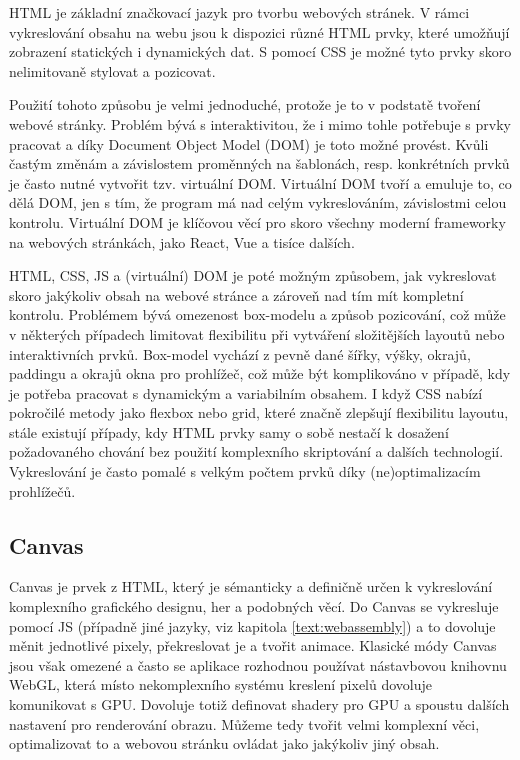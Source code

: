 HTML  je základní značkovací jazyk pro tvorbu webových stránek. 
V rámci vykreslování obsahu na webu jsou k dispozici různé HTML prvky, které umožňují zobrazení statických i dynamických dat.
S pomocí CSS je možné tyto prvky skoro nelimitovaně stylovat a pozicovat.

Použití tohoto způsobu je velmi jednoduché, protože je to v podstatě tvoření webové stránky.
Problém bývá s interaktivitou, že i mimo tohle potřebuje s prvky pracovat a díky Document Object Model (DOM) je toto možné provést.
Kvůli častým změnám a závislostem proměnných na šablonách, resp. konkrétních prvků je často nutné vytvořit tzv. virtuální DOM.
Virtuální DOM tvoří a emuluje to, co dělá DOM, jen s tím, že program má nad celým vykreslováním, závislostmi celou kontrolu.
Virtuální DOM je klíčovou věcí pro skoro všechny moderní frameworky na webových stránkách, jako React, Vue a tisíce dalších.

HTML, CSS, JS a (virtuální) DOM je poté možným způsobem, jak vykreslovat skoro jakýkoliv obsah na webové stránce a zároveň nad tím mít kompletní kontrolu.
Problémem bývá omezenost box-modelu a způsob pozicování, což může v některých případech limitovat flexibilitu při vytváření složitějších layoutů nebo interaktivních prvků. Box-model vychází z pevně dané šířky, výšky, okrajů, paddingu a okrajů okna pro prohlížeč, což může být komplikováno v případě, kdy je potřeba pracovat s dynamickým a variabilním obsahem. 
I když CSS nabízí pokročilé metody jako flexbox nebo grid, které značně zlepšují flexibilitu layoutu, stále existují případy, kdy HTML prvky samy o sobě nestačí k dosažení požadovaného chování bez použití komplexního skriptování a dalších technologií.
Vykreslování je často pomalé s velkým počtem prvků díky (ne)optimalizacím prohlížečů.

\subsection{Canvas}

Canvas je prvek z HTML, který je sémanticky a definičně určen k vykreslování komplexního grafického designu, her a podobných věcí.
Do Canvas se vykresluje pomocí JS (případně jiné jazyky, viz kapitola \ref{text:webassembly}) a to dovoluje měnit jednotlivé pixely, překreslovat je a tvořit animace.
Klasické módy Canvas jsou však omezené a často se aplikace rozhodnou používat nástavbovou knihovnu WebGL, která místo nekomplexního systému kreslení pixelů dovoluje komunikovat s GPU.
Dovoluje totiž definovat shadery pro GPU a spoustu dalších nastavení pro renderování obrazu.
Můžeme tedy tvořit velmi komplexní věci, optimalizovat to a webovou stránku ovládat jako jakýkoliv jiný obsah. 

